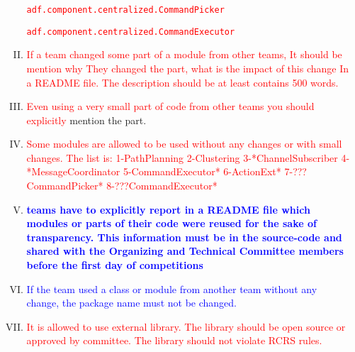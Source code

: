 \documentclass{article}
\begin{document}
\begin{enumerate}[(a)]
\begin{enumerate}[I.]
    \texttt{\textcolor{red}{adf.component.centralized.CommandPicker}}

    \texttt{\textcolor{red}{adf.component.centralized.CommandExecutor}}
    
    \item \textcolor{red}{If a team changed some part of a module from other teams, It should be mention why They changed the part, what is the impact of this change In a README file. The description should be at least contains 500 words.}
    
    \item \textcolor{red}{Even using a very small part of code from other teams you should explicitly} mention the part.
   \item \textcolor{red}{Some modules are allowed to be used without any changes or with small changes. The list is:
1-PathPlanning
2-Clustering
3-*ChannelSubscriber
4-*MessageCoordinator 
5-CommandExecutor*
6-ActionExt*
7-???CommandPicker*
8-???CommandExecutor*
}
  \item \textbf{\textcolor{blue}{teams have to explicitly report in a README file which modules or parts of their code were reused for the sake of transparency. This information must be in the source-code and shared with the Organizing and Technical Committee members before the first day of competitions}}
  \item \textcolor{blue}{If the team used a class or module from another team without any change, the package name must not be changed.}
  \item \textcolor{red}{It is allowed to use external library. The library should be open source or approved by committee. The library should not violate RCRS rules.}
  
\end{enumerate}


\end{enumerate}
\end{document}
